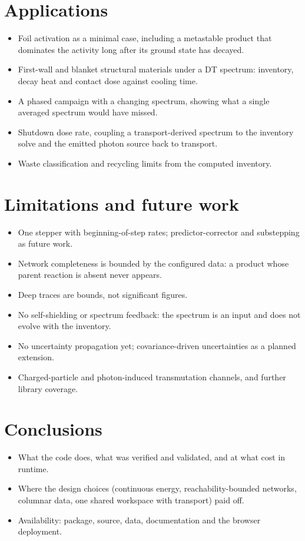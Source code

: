 \section{Applications}
\begin{itemize}
  \item Foil activation as a minimal case, including a metastable product
        that dominates the activity long after its ground state has decayed.
  \item First-wall and blanket structural materials under a DT spectrum:
        inventory, decay heat and contact dose against cooling time.
  \item A phased campaign with a changing spectrum, showing what a single
        averaged spectrum would have missed.
  \item Shutdown dose rate, coupling a transport-derived spectrum to the
        inventory solve and the emitted photon source back to transport.
  \item Waste classification and recycling limits from the computed
        inventory.
\end{itemize}

\section{Limitations and future work}
\begin{itemize}
  \item One stepper with beginning-of-step rates; predictor-corrector and
        substepping as future work.
  \item Network completeness is bounded by the configured data: a product
        whose parent reaction is absent never appears.
  \item Deep traces are bounds, not significant figures.
  \item No self-shielding or spectrum feedback: the spectrum is an input and
        does not evolve with the inventory.
  \item No uncertainty propagation yet; covariance-driven uncertainties as a
        planned extension.
  \item Charged-particle and photon-induced transmutation channels, and
        further library coverage.
\end{itemize}

\section{Conclusions}
\begin{itemize}
  \item What the code does, what was verified and validated, and at what
        cost in runtime.
  \item Where the design choices (continuous energy, reachability-bounded
        networks, columnar data, one shared workspace with transport) paid
        off.
  \item Availability: package, source, data, documentation and the browser
        deployment.
\end{itemize}

